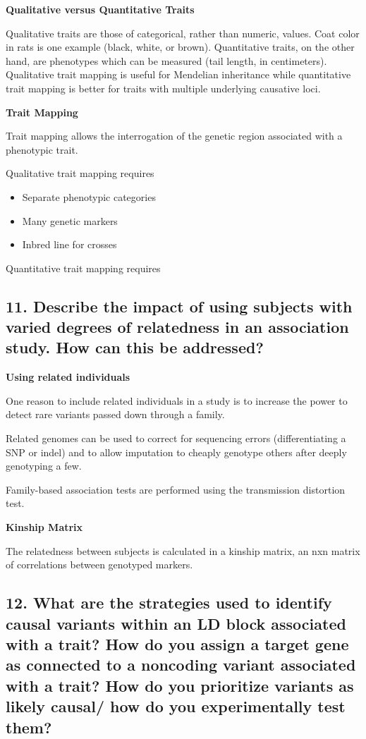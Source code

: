 \documentclass{tufte-handout}
\theoremstyle{noparens}
\begin{document}
\textbf{Qualitative versus Quantitative Traits}

Qualitative traits are those of categorical, rather than numeric, values. Coat color in rats is one example (black, white, or brown). Quantitative traits, on the other hand, are phenotypes which can be measured (tail length, in centimeters). Qualitative trait mapping is useful for Mendelian inheritance while quantitative trait mapping is better for traits with multiple underlying causative loci.

\textbf{Trait Mapping}

Trait mapping allows the interrogation of the genetic region associated with a phenotypic trait. 

Qualitative trait mapping requires

\begin{itemize}
\item Separate phenotypic categories
\item Many genetic markers
\item Inbred line for crosses
\end{itemize}

Quantitative trait mapping requires

\newpage
\subsection{11. 
Describe the impact of using subjects with varied degrees of relatedness in an association study. How can this be addressed?}

\noindent
\textbf{Using related individuals}

One reason to include related individuals in a study is to increase the power to detect rare variants passed down through a family. 

Related genomes can be used to correct for sequencing errors (differentiating a SNP or indel) and to allow imputation to cheaply genotype others after deeply genotyping a few.

Family-based association tests are performed using the transmission distortion test. 

\textbf{Kinship Matrix}

The relatedness between subjects is calculated in a kinship matrix, an nxn matrix of correlations between genotyped markers.

\newpage
\subsection{12.
What are the strategies used to identify causal variants within an LD block associated with a trait? How do you assign a target gene as connected to a noncoding variant associated with a trait? How do you prioritize variants as likely causal/ how do you experimentally test them?
}
\end{document}
